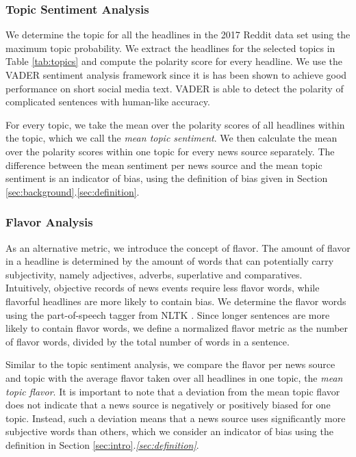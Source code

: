 \documentclass[final]{ieee}
\begin{document}
\subsubsection{Topic Sentiment Analysis}\label{sec:topic sent}

We determine the topic for all the headlines in the 2017 Reddit data set using the maximum topic probability. We extract the headlines for the selected topics in Table \ref{tab:topics} and compute the polarity score for every headline. We use the VADER sentiment analysis framework \cite{VAD14} since it is has been shown to achieve good performance on short social media text. VADER is able to detect the polarity of complicated sentences with human-like accuracy.

For every topic, we take the mean over the polarity scores of all headlines within the topic, which we call the \textit{mean topic sentiment}. We then calculate the mean over the polarity scores within one topic for every news source separately. The difference between the mean sentiment per news source and the mean topic sentiment is an indicator of bias, using the definition of bias given in Section \ref{sec:background}.\ref{sec:definition}.

\subsubsection{Flavor Analysis}\label{sec:flavor}

As an alternative metric, we introduce the concept of flavor. The amount of flavor in a headline is determined by the amount of words that can potentially carry subjectivity, namely adjectives, adverbs, superlative and comparatives. Intuitively, objective records of news events require less flavor words, while flavorful headlines are more likely to contain bias. We determine the flavor words using the part-of-speech tagger from NLTK \cite{NLTK09}. Since longer sentences are more likely to contain flavor words, we define a normalized flavor metric as the number of flavor words, divided by the total number of words in a sentence.

Similar to the topic sentiment analysis, we compare the flavor per news source and topic with the average flavor taken over all headlines in one topic, the \textit{mean topic flavor}. It is important to note that a deviation from the mean topic flavor does not indicate that a news source is negatively or positively biased for one topic. Instead, such a deviation means that a news source uses significantly more subjective words than others, which we consider an indicator of bias using the definition in Section \ref{sec:intro}.\textit{\ref{sec:definition}}. 
\end{document}

